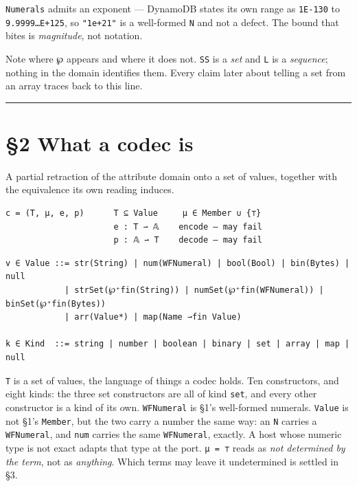 \texttt{Numerals} admits an exponent — DynamoDB states its own range \cite{dynamodb-types} as \texttt{1E-130} to \texttt{9.9999…E+125}, so
\texttt{"1e+21"} is a well-formed \texttt{N} and not a defect. The bound that bites is \emph{magnitude}, not notation.

Note where \texttt{℘} appears and where it does not. \texttt{SS} is a \emph{set} and \texttt{L} is a \emph{sequence}; nothing in the
domain identifies them. Every claim later about telling a set from an array traces back to this line.

\begin{center}\rule{0.5\linewidth}{0.5pt}\end{center}

\section{§2 What a codec is}\label{2-what-a-codec-is}

A partial retraction of the attribute domain onto a set of values, together with the equivalence its
own reading induces.

\begin{verbatim}
c = (T, μ, e, p)      T ⊆ Value     μ ∈ Member ∪ {⊤}
                      e : T ⇀ 𝔸    encode — may fail
                      p : 𝔸 ⇀ T    decode — may fail
\end{verbatim}

\begin{verbatim}
v ∈ Value ::= str(String) | num(WFNumeral) | bool(Bool) | bin(Bytes) | null
            | strSet(℘⁺fin(String)) | numSet(℘⁺fin(WFNumeral)) | binSet(℘⁺fin(Bytes))
            | arr(Value*) | map(Name ⇀fin Value)

k ∈ Kind  ::= string | number | boolean | binary | set | array | map | null
\end{verbatim}

\texttt{T} is a set of values, the language of things a codec holds. Ten constructors, and eight
kinds: the three set constructors are all of kind \texttt{set}, and every other constructor is a kind
of its own. \texttt{WFNumeral} is §1's well-formed numerals. \texttt{Value} is not §1's \texttt{Member}, but
the two carry a number the same way: an \texttt{N} carries a \texttt{WFNumeral}, and \texttt{num} carries the same
\texttt{WFNumeral}, exactly. A host whose numeric type is not exact adapts that type at the port. \texttt{μ\ =\ ⊤} reads as
\emph{not determined by the term}, not as \emph{anything}. Which terms may leave it
undetermined is settled in §3.

